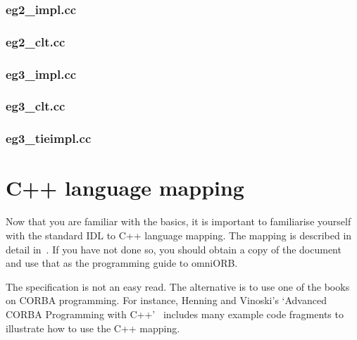 \documentclass[11pt,oneside,a4paper]{book}
\begin{document}
\clearpage
\subsection{eg2\_impl.cc}



\clearpage
\subsection{eg2\_clt.cc}



\clearpage
\subsection{eg3\_impl.cc}



\clearpage
\subsection{eg3\_clt.cc}



\clearpage
\subsection{eg3\_tieimpl.cc}




\chapter{C++ language mapping}

Now that you are familiar with the basics, it is important to
familiarise yourself with the standard IDL to C++ language mapping.
The mapping is described in detail in~\cite{cxxmapping}. If you have
not done so, you should obtain a copy of the document and use that as
the programming guide to omniORB.

The specification is not an easy read. The alternative is to use one
of the books on CORBA programming. For instance, Henning and Vinoski's
`Advanced CORBA Programming with C++'~\cite{henning1999} includes many
example code fragments to illustrate how to use the C++ mapping.
\end{document}
